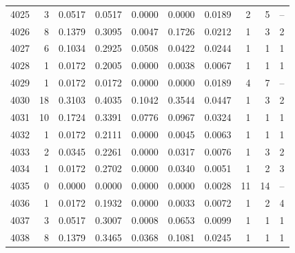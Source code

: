 \begin{longtable}{rrrrrrrrrr}
4025 & 3 & 0.0517 & 0.0517 & 0.0000 & 0.0000 & 0.0189 & 2 & 5 & -- \\
4026 & 8 & 0.1379 & 0.3095 & 0.0047 & 0.1726 & 0.0212 & 1 & 3 & 2 \\
4027 & 6 & 0.1034 & 0.2925 & 0.0508 & 0.0422 & 0.0244 & 1 & 1 & 1 \\
4028 & 1 & 0.0172 & 0.2005 & 0.0000 & 0.0038 & 0.0067 & 1 & 1 & 1 \\
4029 & 1 & 0.0172 & 0.0172 & 0.0000 & 0.0000 & 0.0189 & 4 & 7 & -- \\
4030 & 18 & 0.3103 & 0.4035 & 0.1042 & 0.3544 & 0.0447 & 1 & 3 & 2 \\
4031 & 10 & 0.1724 & 0.3391 & 0.0776 & 0.0967 & 0.0324 & 1 & 1 & 1 \\
4032 & 1 & 0.0172 & 0.2111 & 0.0000 & 0.0045 & 0.0063 & 1 & 1 & 1 \\
4033 & 2 & 0.0345 & 0.2261 & 0.0000 & 0.0317 & 0.0076 & 1 & 3 & 2 \\
4034 & 1 & 0.0172 & 0.2702 & 0.0000 & 0.0340 & 0.0051 & 1 & 2 & 3 \\
4035 & 0 & 0.0000 & 0.0000 & 0.0000 & 0.0000 & 0.0028 & 11 & 14 & -- \\
4036 & 1 & 0.0172 & 0.1932 & 0.0000 & 0.0033 & 0.0072 & 1 & 2 & 4 \\
4037 & 3 & 0.0517 & 0.3007 & 0.0008 & 0.0653 & 0.0099 & 1 & 1 & 1 \\
4038 & 8 & 0.1379 & 0.3465 & 0.0368 & 0.1081 & 0.0245 & 1 & 1 & 1 \\
\end{longtable}
